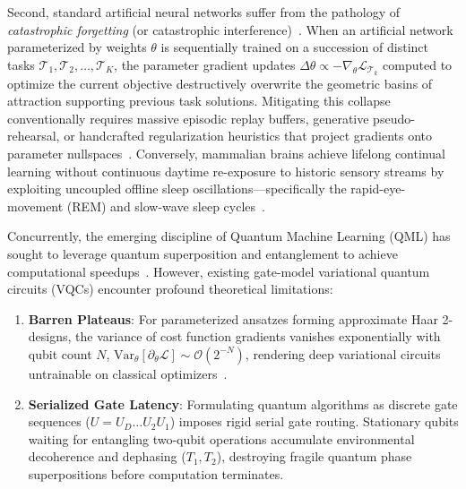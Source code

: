 \documentclass[10pt,twocolumn,3p]{article}
\begin{document}
Second, standard artificial neural networks suffer from the pathology of \textit{catastrophic forgetting} (or catastrophic interference)~\cite{mccloskey1989,french1999,kirkpatrick2017}. When an artificial network parameterized by weights $\theta$ is sequentially trained on a succession of distinct tasks $\mathcal{T}_1, \mathcal{T}_2, \dots, \mathcal{T}_K$, the parameter gradient updates $\Delta \theta \propto -\nabla_\theta \mathcal{L}_{\mathcal{T}_k}$ computed to optimize the current objective destructively overwrite the geometric basins of attraction supporting previous task solutions. Mitigating this collapse conventionally requires massive episodic replay buffers, generative pseudo-rehearsal, or handcrafted regularization heuristics that project gradients onto parameter nullspaces~\cite{lopezpaz2017}. Conversely, mammalian brains achieve lifelong continual learning without continuous daytime re-exposure to historic sensory streams by exploiting uncoupled offline sleep oscillations—specifically the rapid-eye-movement (REM) and slow-wave sleep cycles~\cite{diekelmann2010,stickgold2005}.

Concurrently, the emerging discipline of Quantum Machine Learning (QML) has sought to leverage quantum superposition and entanglement to achieve computational speedups~\cite{biamonte2017}. However, existing gate-model variational quantum circuits (VQCs) encounter profound theoretical limitations:
\begin{enumerate}
    \item \textbf{Barren Plateaus}: For parameterized ansatzes forming approximate Haar 2-designs, the variance of cost function gradients vanishes exponentially with qubit count $N$, $\text{Var}_\theta[\partial_\theta \mathcal{L}] \sim \mathcal{O}(2^{-N})$, rendering deep variational circuits untrainable on classical optimizers~\cite{mcclean2018,cerezo2021}.
    \item \textbf{Serialized Gate Latency}: Formulating quantum algorithms as discrete gate sequences ($U = U_D \dots U_2 U_1$) imposes rigid serial gate routing. Stationary qubits waiting for entangling two-qubit operations accumulate environmental decoherence and dephasing ($T_1, T_2$), destroying fragile quantum phase superpositions before computation terminates.
\end{enumerate}
\end{document}
